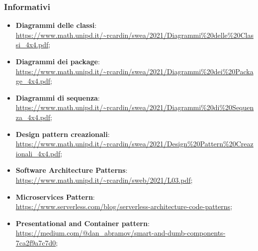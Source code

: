 \subsubsection{Informativi}
\begin{itemize}
	\item \textbf{Diagrammi delle classi}:\\  \url{https://www.math.unipd.it/~rcardin/swea/2021/Diagrammi\%20delle\%20Classi_4x4.pdf};
	\item \textbf{Diagrammi dei package}:\\  \url{https://www.math.unipd.it/~rcardin/swea/2021/Diagrammi\%20dei\%20Package_4x4.pdf};
	\item \textbf{Diagrammi di sequenza}:\\  \url{https://www.math.unipd.it/~rcardin/swea/2021/Diagrammi\%20di\%20Sequenza_4x4.pdf};
	
	\item \textbf{Design pattern creazionali}:\\  \url{https://www.math.unipd.it/~rcardin/swea/2021/Design\%20Pattern\%20Creazionali_4x4.pdf};
	
	\item \textbf{Software Architecture Patterns}:\\  \url{https://www.math.unipd.it/~rcardin/sweb/2021/L03.pdf};
	
	\item \textbf{Microservices Pattern}:\\  \url{https://www.serverless.com/blog/serverless-architecture-code-patterns};
	
	\item \textbf{Presentational and Container pattern}: \\  \url{https://medium.com/@dan_abramov/smart-and-dumb-components-7ca2f9a7c7d0};
	
	
	
	
	
	
	
	
\end{itemize}

